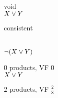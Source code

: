 \begin{frame}{\myframetitle}
\begin{mycolumns}[t]
\begin{exampletight}{}
\begin{mycolumns}[animation=none]
				void
			\mynextcolumn
				\centering
				{\small{}\\$X \vee Y$}

				consistent
			\end{mycolumns}
		\end{exampletight}
		\mynextcolumn
		\begin{exampletight}{}
			\begin{mycolumns}[animation=none]
				\centering
				{\small{}\\$\neg (X \vee Y)$}

				$0$ products, VF $0$
			\mynextcolumn
				\centering
				{\small{}\\$X \vee Y$}

				$2$ products, VF $\frac{2}{8}$
			\end{mycolumns}
		\end{exampletight}
	\end{mycolumns}
\end{frame}

